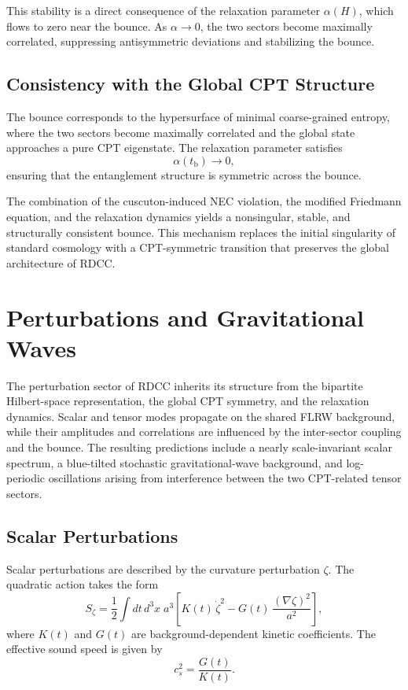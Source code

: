 \documentclass[11pt,a4paper]{article}
\begin{document}
This stability is a direct consequence of the relaxation parameter
\(\alpha(H)\), which flows to zero near the bounce. As \(\alpha \to 0\), the two
sectors become maximally correlated, suppressing antisymmetric deviations and
stabilizing the bounce.

\subsection{Consistency with the Global CPT Structure}

The bounce corresponds to the hypersurface of minimal coarse-grained entropy,
where the two sectors become maximally correlated and the global state
approaches a pure CPT eigenstate. The relaxation parameter satisfies
\begin{equation}
    \alpha(t_{\mathrm{b}}) \to 0,
\end{equation}
ensuring that the entanglement structure is symmetric across the bounce.

The combination of the cuscuton-induced NEC violation, the modified Friedmann
equation, and the relaxation dynamics yields a nonsingular, stable, and
structurally consistent bounce. This mechanism replaces the initial singularity
of standard cosmology with a CPT-symmetric transition that preserves the global
architecture of RDCC.

\section{Perturbations and Gravitational Waves}

The perturbation sector of RDCC inherits its structure from the bipartite
Hilbert-space representation, the global CPT symmetry, and the relaxation
dynamics. Scalar and tensor modes propagate on the shared FLRW background, while
their amplitudes and correlations are influenced by the inter-sector coupling
and the bounce. The resulting predictions include a nearly scale-invariant
scalar spectrum, a blue-tilted stochastic gravitational-wave background, and
log-periodic oscillations arising from interference between the two CPT-related
tensor sectors.

\subsection{Scalar Perturbations}

Scalar perturbations are described by the curvature perturbation \(\zeta\). The
quadratic action takes the form
\begin{equation}
    S_{\zeta}
        = \frac{1}{2}
          \int dt\,d^{3}x\;
          a^{3}\left[
              K(t)\,\dot{\zeta}^{2}
              - G(t)\,\frac{(\nabla\zeta)^{2}}{a^{2}}
          \right],
\end{equation}
where \(K(t)\) and \(G(t)\) are background-dependent kinetic coefficients. The
effective sound speed is given by
\begin{equation}
    c_{s}^{2} = \frac{G(t)}{K(t)}.
\end{equation}
\end{document}
